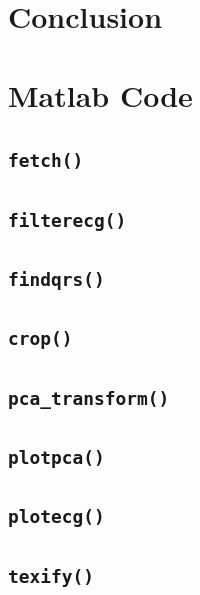 \documentclass[12pt,letter]{article}
\begin{document}
\section{Conclusion}

\newpage
\appendix
\section{Matlab Code}
\subsection{\texttt{fetch()}}
\label{fun:fetch}


\subsection{\texttt{filterecg()}}
\label{fun:filter}


\subsection{\texttt{findqrs()}}
\label{fun:qrs}


\subsection{\texttt{crop()}}
\label{fun:crop}


\subsection{\texttt{pca\_transform()}}
\label{fun:pca}


\subsection{\texttt{plotpca()}}
\label{fun:plotpca}


\subsection{\texttt{plotecg()}}
\label{fun:plotecg}


\subsection{\texttt{texify()}}
\label{fun:tex}

\end{document}
